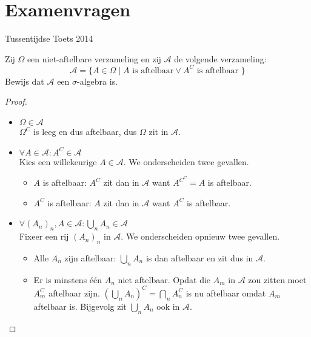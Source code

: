 \documentclass[main.tex]{subfiles}
\begin{document}
\chapter{Examenvragen}
\label{cha:examenvragen}


\begin{examenvraag}{Tussentijdse Toets 2014}
  \begin{ex-vraag}
  Zij $\Omega$ een niet-aftelbare verzameling en zij $\mathcal{A}$ de volgende verzameling:
  \[ \mathcal{A} = \{ A \in \Omega \mid A \text{ is aftelbaar} \vee A^{C} \text{ is aftelbaar } \} \]
  Bewijs dat $\mathcal{A}$ een $\sigma$-algebra is.
  \end{ex-vraag}

  \begin{ex-antwoord}
    \begin{proof}
      \begin{itemize}
      \item $\Omega \in \mathcal{A}$\\
        $\Omega^{C}$ is leeg en dus aftelbaar, dus $\Omega$ zit in $\mathcal{A}$.
      \item $\forall A \in \mathcal{A}: A^{C}\in \mathcal{A}$\\
        Kies een willekeurige $A \in \mathcal{A}$. 
        We onderscheiden twee gevallen.
        \begin{itemize}
        \item $A$ is aftelbaar: $A^{C}$ zit dan in $\mathcal{A}$ want $A^{C^{C}} = A$ is aftelbaar.
        \item $A^{C}$ is aftelbaar: $A$ zit dan in $\mathcal{A}$ want $A^{C}$ is aftelbaar.
        \end{itemize}
      \item $\forall (A_{n})_{n}, A\in \mathcal{A}: \bigcup_{n} A_{n} \in \mathcal{A}$\\
        Fixeer een rij $(A_{n})_{n}$ in $\mathcal{A}$.
        We onderscheiden opnieuw twee gevallen.
        \begin{itemize}
        \item Alle $A_{n}$ zijn aftelbaar: $\bigcup_{n}A_{n}$ is dan aftelbaar en zit dus in $\mathcal{A}$.
        \item Er is minstens \'e\'en $A_{n}$ niet aftelbaar. Opdat die $A_{m}$ in $\mathcal{A}$ zou zitten moet $A_{m}^{C}$ aftelbaar zijn.
          $\left(\bigcup_{n}A_{n}\right)^{C} = \bigcap_{n}A_{n}^{C}$ is nu aftelbaar omdat $A_{m}$ aftelbaar is.
          Bijgevolg zit $\bigcup_{n}A_{n}$ ook in $\mathcal{A}$.
        \end{itemize}
      \end{itemize}
    \end{proof}
  \end{ex-antwoord}
\end{examenvraag}
\end{document}
